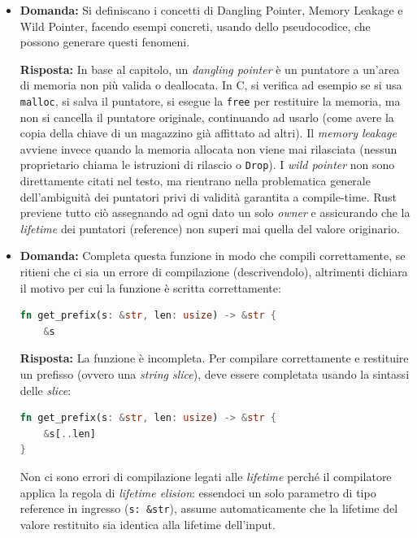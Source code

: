 \begin{itemize}
    \item \begin{exambox}
    \textbf{Domanda:} Si definiscano i concetti di Dangling Pointer, Memory Leakage e Wild Pointer, facendo esempi concreti, usando dello pseudocodice, che possono generare questi fenomeni.
    
    \textbf{Risposta:} In base al capitolo, un \emph{dangling pointer} è un puntatore a un'area di memoria non più valida o deallocata. In C, si verifica ad esempio se si usa \texttt{malloc}, si salva il puntatore, si esegue la \texttt{free} per restituire la memoria, ma non si cancella il puntatore originale, continuando ad usarlo (come avere la copia della chiave di un magazzino già affittato ad altri). Il \emph{memory leakage} avviene invece quando la memoria allocata non viene mai rilasciata (nessun proprietario chiama le istruzioni di rilascio o \texttt{Drop}). I \emph{wild pointer} non sono direttamente citati nel testo, ma rientrano nella problematica generale dell'ambiguità dei puntatori privi di validità garantita a compile-time. Rust previene tutto ciò assegnando ad ogni dato un solo \emph{owner} e assicurando che la \emph{lifetime} dei puntatori (reference) non superi mai quella del valore originario.
    \end{exambox}

    \item \begin{exambox}
    \textbf{Domanda:} Completa questa funzione in modo che compili correttamente, se ritieni che ci sia un errore di compilazione (descrivendolo), altrimenti dichiara il motivo per cui la funzione è scritta correttamente:
\begin{lstlisting}[language=Rust]
fn get_prefix(s: &str, len: usize) -> &str {
    &s
\end{lstlisting}

    \textbf{Risposta:} La funzione è incompleta. Per compilare correttamente e restituire un prefisso (ovvero una \emph{string slice}), deve essere completata usando la sintassi delle \emph{slice}:
\begin{lstlisting}[language=Rust]
fn get_prefix(s: &str, len: usize) -> &str {
    &s[..len]
}
\end{lstlisting}
    Non ci sono errori di compilazione legati alle \emph{lifetime} perché il compilatore applica la regola di \emph{lifetime elision}: essendoci un solo parametro di tipo reference in ingresso (\texttt{s: \&str}), assume automaticamente che la lifetime del valore restituito sia identica alla lifetime dell'input.
    \end{exambox}


\end{itemize}

